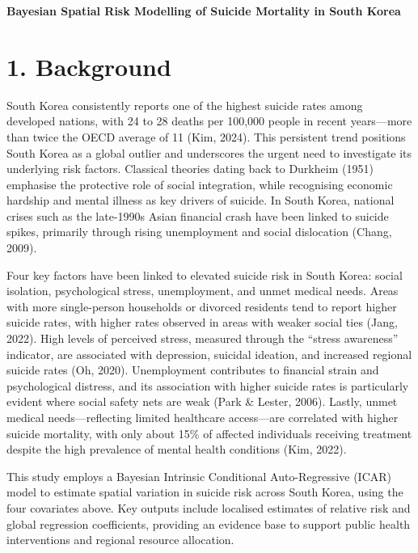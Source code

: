 \documentclass[11pt]{article}
\begin{document}
	
	\begin{center}
		\LARGE\textbf{Bayesian Spatial Risk Modelling of Suicide Mortality in South Korea}
	\end{center}
	
	\section*{1. Background}
	
	South Korea consistently reports one of the highest suicide rates among developed nations, with 24 to 28 deaths per 100,000 people in recent years—more than twice the OECD average of 11 (Kim, 2024). This persistent trend positions South Korea as a global outlier and underscores the urgent need to investigate its underlying risk factors. Classical theories dating back to Durkheim (1951) emphasise the protective role of social integration, while recognising economic hardship and mental illness as key drivers of suicide. In South Korea, national crises such as the late-1990s Asian financial crash have been linked to suicide spikes, primarily through rising unemployment and social dislocation (Chang, 2009).
	
	Four key factors have been linked to elevated suicide risk in South Korea: social isolation, psychological stress, unemployment, and unmet medical needs. Areas with more single-person households or divorced residents tend to report higher suicide rates, with higher rates observed in areas with weaker social ties (Jang, 2022). High levels of perceived stress, measured through the “stress awareness” indicator, are associated with depression, suicidal ideation, and increased regional suicide rates (Oh, 2020). Unemployment contributes to financial strain and psychological distress, and its association with higher suicide rates is particularly evident where social safety nets are weak (Park \& Lester, 2006). Lastly, unmet medical needs—reflecting limited healthcare access—are correlated with higher suicide mortality, with only about 15\% of affected individuals receiving treatment despite the high prevalence of mental health conditions (Kim, 2022).
	
	This study employs a Bayesian Intrinsic Conditional Auto-Regressive (ICAR) model to estimate spatial variation in suicide risk across South Korea, using the four covariates above. Key outputs include localised estimates of relative risk and global regression coefficients, providing an evidence base to support public health interventions and regional resource allocation.
\end{document}
